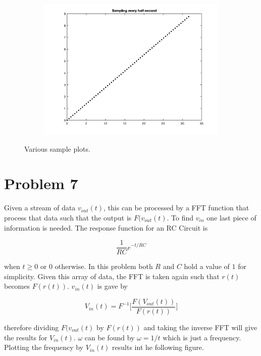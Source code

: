 \documentclass[12pt]{article}
\begin{document}
\begin{figure}[h!]
\begin{subfigure}{0.49\columnwidth}
\centering
\includegraphics[width=\textwidth]{problem_6_3.png}
\caption{}
\label{fig:time3}
\end{subfigure}\hfill

\caption{Various sample plots.}
\label{fig:time}

\end{figure}

\newpage

\newpage

\section*{Problem 7}

Given a stream of data $v_{out}(t)$, this can be processed by a FFT function that process that data such that the output is $F(v_{out}(t)$. To find $v_{in}$ one last piece of information is needed. The response function for an RC Circuit is 

$$
\frac{1}{RC}e^{-t/RC}
$$

when $t \ge 0$ or $0$ otherwise. In this problem both $R$ and $C$ hold a value of $1$ for simplicity. Given this array of data, the FFT is taken again such that $r(t)$ becomes $F(r(t))$. $v_{in}(t)$ is gave by

$$
V_{in}(t) = F^{-1}\Bigg[ \frac{F(V_{out}(t))}{F(r(t))}\Bigg]
$$

therefore dividing $F(v_{out}(t)$ by $F(r(t))$ and taking the inverse FFT will give the results for $V_{in}(t)$. $\omega$ can be found by $\omega = 1/t$ which is just a frequency. Plotting the frequency by $V_{in}(t)$ results int he following figure.
\end{document}
